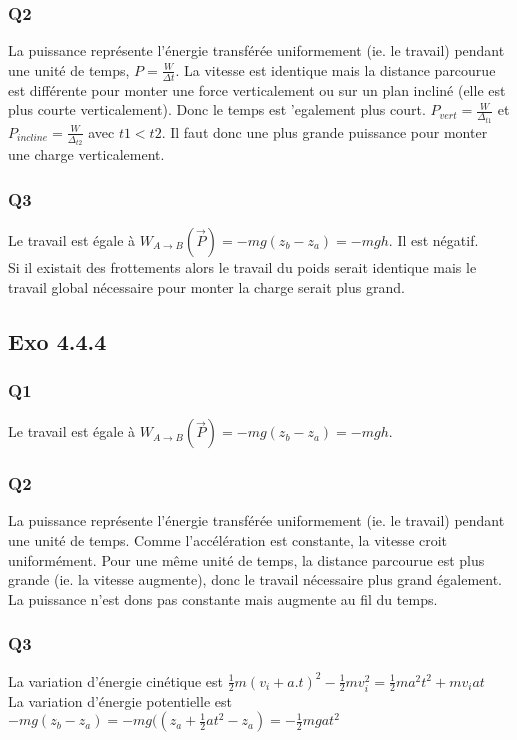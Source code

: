 \documentclass[]{book}
\theoremstyle{definition}
\begin{document}
\subsubsection{Q2}
La puissance repr\'esente l'\'energie transf\'er\'ee uniformement (ie. le travail) pendant une unit\'e de temps, $P =\frac{W}{\Delta t}$. La vitesse est identique mais la distance parcourue est diff\'erente  pour monter une force verticalement ou sur un plan inclin\'e (elle est plus courte verticalement). Donc le temps est 'egalement plus court. $P_{vert} = \frac{W}{\Delta_{t1}}$ et $P_{incline} = \frac{W}{\Delta_{t2}}$ avec $t1 < t2$. Il faut donc une plus grande puissance pour monter une charge verticalement.

\subsubsection{Q3}
Le travail est \'egale \`a $W_{A \to B}(\overrightarrow{P}) = -mg(z_b - z_a) = -mgh$. Il est n\'egatif.\\
Si il existait des frottements alors le travail du poids serait identique mais le travail global n\'ecessaire pour monter la charge serait plus grand. 


\subsection*{Exo 4.4.4}
\subsubsection{Q1}
Le travail est \'egale \`a $W_{A \to B}(\overrightarrow{P}) = -mg(z_b - z_a) = -mgh$.

\subsubsection{Q2}
La puissance repr\'esente l'\'energie transf\'er\'ee uniformement (ie. le travail) pendant une unit\'e de temps. Comme l'acc\'el\'eration est constante, la vitesse croit uniform\'ement. Pour une m\^eme unit\'e de temps, la distance parcourue est plus grande (ie. la vitesse augmente), donc le travail n\'ecessaire plus grand \'egalement. La puissance n'est dons pas constante mais augmente au fil du temps.

\subsubsection{Q3}
La variation d'\'energie cin\'etique est $\frac{1}{2}m(v_i + a.t)^2 - \frac{1}{2}mv_i^2 = \frac{1}{2}ma^2t^2 + mv_iat$\\
La variation d'\'energie potentielle est $-mg(z_b - z_a) = -mg((z_a + \frac{1}{2}at^2 - z_a) = -\frac{1}{2}mgat^2$\\
\end{document}
